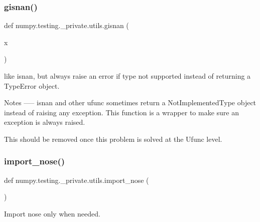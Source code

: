 \subsubsection{\texorpdfstring{gisnan()}{gisnan()}}
{\footnotesize\ttfamily def numpy.\+testing.\+\_\+private.\+utils.\+gisnan (\begin{DoxyParamCaption}\item[{}]{x }\end{DoxyParamCaption})}

\begin{DoxyVerb}like isnan, but always raise an error if type not supported instead of
returning a TypeError object.

Notes
-----
isnan and other ufunc sometimes return a NotImplementedType object instead
of raising any exception. This function is a wrapper to make sure an
exception is always raised.

This should be removed once this problem is solved at the Ufunc level.\end{DoxyVerb}
 \mbox{\label{namespacenumpy_1_1testing_1_1__private_1_1utils_af4a22ba8893271359ffa7f6609bbd824}} 
\subsubsection{\texorpdfstring{import\+\_\+nose()}{import\_nose()}}
{\footnotesize\ttfamily def numpy.\+testing.\+\_\+private.\+utils.\+import\+\_\+nose (\begin{DoxyParamCaption}{ }\end{DoxyParamCaption})}

\begin{DoxyVerb}Import nose only when needed.
\end{DoxyVerb}
 \mbox{\label{namespacenumpy_1_1testing_1_1__private_1_1utils_afadd7a26ace0ebf2ba465d5f565ce283}} 
